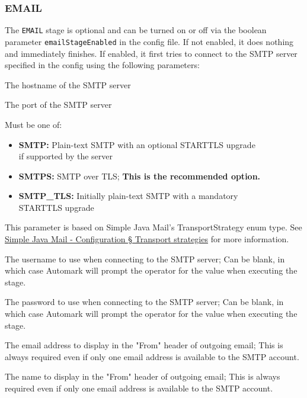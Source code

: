 \documentclass[12pt,a4paper,oneside]{report}
\begin{document}
	\subsubsection{EMAIL} \label{subsubsec:email}
	The \lstinline|EMAIL| stage is optional and can be turned on or off via the boolean parameter \lstinline|emailStageEnabled| in the config file. If not enabled, it does nothing and immediately finishes. If enabled, it first tries to connect to the SMTP server specified in the config using the following parameters:
	\begin{description}[align=left]
		\item[smtpHost] The hostname of the SMTP server
		\item[smtpPort] The port of the SMTP server
		\item[smtpProtocol] Must be one of:
			\begin{itemize}
				\item \textbf{SMTP:} Plain-text SMTP with an optional STARTTLS upgrade \\if supported by the server
				\item \textbf{SMTPS:} SMTP over TLS; \textbf{This is the recommended option.}
				\item \textbf{SMTP\_TLS:} Initially plain-text SMTP with a mandatory \\STARTTLS upgrade
			\end{itemize}
		This parameter is based on Simple Java Mail's TransportStrategy enum type. See \href{http://www.simplejavamail.org/configuration.html#section-transport-strategies}{Simple Java Mail - Configuration § Transport strategies} for more information.
		\item[smtpUsername] The username to use when connecting to the SMTP server; Can be blank, in which case Automark will prompt the operator for the value when executing the stage.
		\item[smtpPassword] The password to use when connecting to the SMTP server; Can be blank, in which case Automark will prompt the operator for the value when executing the stage.
		\item[smtpFromAddress] The email address to display in the "From" header of outgoing email; This is always required even if only one email address is available to the SMTP account.
		\item[smtpFromName] The name to display in the "From" header of outgoing email; This is always required even if only one email address is available to the SMTP account.
	\end{description}
\end{document}
